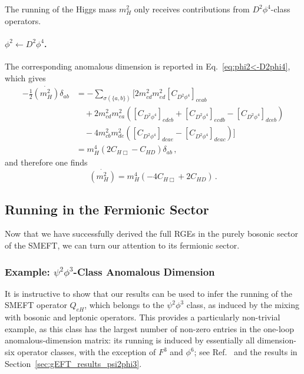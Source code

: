 The running of the Higgs mass $m_H^2$ only receives contributions from $D^2\phi^4$-class operators.

\paragraph{$\phi^2\leftarrow D^2\phi^4$.}
The corresponding anomalous dimension is reported in Eq.~\eqref{eq:phi2<-D2phi4}, which gives 
\begin{align}
    -\frac{1}{2}\dot{(m_H^2)}\delta_{ab} &= -\sum_{\sigma(\{a,b\})}\Bigg[2 m_{cd}^2 m_{ed}^2\left[C_{D^2\phi^4}\right]_{ceab}
    \nonumber \\
    &\quad +2m_{cd}^2 m_{ea}^2 \left(\left[C_{D^2\phi^4}\right]_{edcb}+\left[C_{D^2\phi^4}\right]_{ecdb}-\left[C_{D^2\phi^4}\right]_{dceb}\right)\nonumber \\
    &\quad-4m^2_{cb} m^2_{de}
    \left(
    \left[C_{D^2\phi^4}\right]_{dcae}-\left[C_{D^2\phi^4}\right]_{deac}
    \right)
    \Bigg] \nonumber \\
    &= m_H^4\left(2 C_{H\Box}-C_{HD}\right)\delta_{ab}\,,
\end{align}
and therefore one finds
\begin{equation}
    \dot{(m_H^2)} = m_H^4 \left(-4C_{H\Box}+2C_{HD}\right)\,.
\end{equation}


\subsection{Running in the Fermionic Sector}

Now that we have successfully derived the full RGEs in the purely bosonic sector of the SMEFT, we can turn our attention to its fermionic sector.

\subsubsection{Example: $\psi^2\phi^3$-Class Anomalous Dimension}

It is instructive to show that our results can be used to infer the running of the SMEFT operator $Q_{eH}$, which belongs to the $\psi^2\phi^3$ class, as induced by the mixing with bosonic and leptonic operators. 
This provides a particularly non-trivial example, as this class has the largest number of non-zero entries in the one-loop anomalous-dimension matrix: its running is induced by essentially all dimension-six operator classes, with the exception of $F^3$ and $\phi^6$; see Ref.~\cite{Cheung:2015aba} and the results in Section~\ref{sec:gEFT_results_psi2phi3}.

